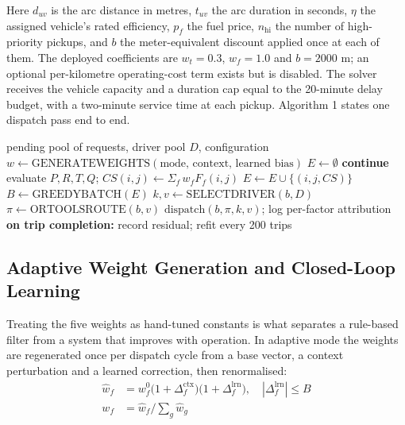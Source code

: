 \documentclass[conference]{IEEEtran}
\begin{document}
Here $d_{uv}$ is the arc distance in metres, $t_{uv}$ the arc duration in seconds, $\eta$ the assigned vehicle's rated efficiency, $p_f$ the fuel price, $n_{\text{hi}}$ the number of high-priority pickups, and $b$ the meter-equivalent discount applied once at each of them. The deployed coefficients are $w_t = 0.3$, $w_f = 1.0$ and $b = 2000$ m; an optional per-kilometre operating-cost term exists but is disabled. The solver receives the vehicle capacity and a duration cap equal to the 20-minute delay budget, with a two-minute service time at each pickup. Algorithm 1 states one dispatch pass end to end.

\begin{algorithm}[t]
\caption{DMFE single dispatch pass}
\begin{algorithmic}[1]
\Require pending pool of requests, driver pool $D$, configuration
\State $w \gets \text{GENERATEWEIGHTS}(\text{mode, context, learned bias})$
\State $E \gets \emptyset$
     \textbf{continue} \EndIf
    \State evaluate $P, R, T, Q$; $CS(i, j) \gets \Sigma_f \, w_f F_f(i, j)$
        \State $E \gets E \cup \{(i, j, CS)\}$
    \EndIf
\EndFor
\State $B \gets \text{GREEDYBATCH}(E)$ 
    \State $k, v \gets \text{SELECTDRIVER}(b, D)$
    \State $\pi \gets \text{ORTOOLSROUTE}(b, v)$
    \State $\text{dispatch}(b, \pi, k, v)$; log per-factor attribution
\EndFor
\State \textbf{on trip completion:} record residual; refit every 200 trips
\end{algorithmic}
\end{algorithm}

\subsection{Adaptive Weight Generation and Closed-Loop Learning}
Treating the five weights as hand-tuned constants is what separates a rule-based filter from a system that improves with operation. In adaptive mode the weights are regenerated once per dispatch cycle from a base vector, a context perturbation and a learned correction, then renormalised:
\begin{equation}
\begin{aligned}
\hat{w}_f &= w_f^0 \big(1 + \Delta^{\text{ctx}}_f\big) \big(1 + \Delta^{\text{lrn}}_f\big), \quad |\Delta^{\text{lrn}}_f| \le B \\
w_f &= \hat{w}_f \Big/ {\sum}_g \hat{w}_g
\end{aligned}
\end{equation}
\end{document}
